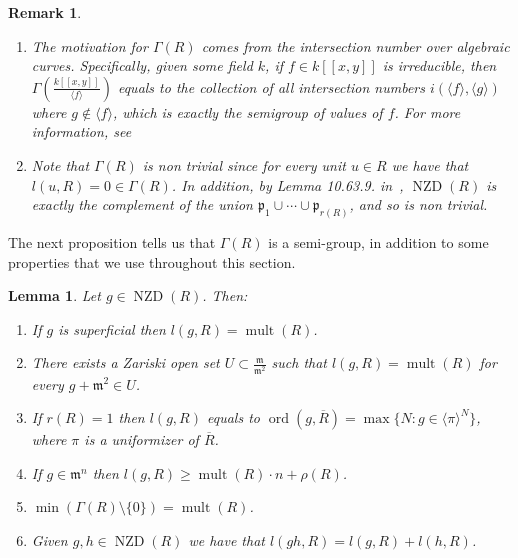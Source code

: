 \documentclass{article}
\newtheorem{lemma}[theorem]{Lemma}
\newtheorem{remark}[theorem]{Remark}
\DeclareMathOperator{\ord}{ord}
\DeclareMathOperator{\NZD}{NZD}
\DeclareMathOperator{\mult}{mult}
\numberwithin{theorem}{section}
\begin{document}
\begin{remark}\label{rem:intersection}
\begin{enumerate}
    \item \textup{The motivation for $\Gamma(R)$ comes from the intersection number over algebraic curves. Specifically, given some field $k$, if $f \in k[[x,y]]$ is irreducible, then $\Gamma\left(\frac{k[[x,y]]}{\langle f\rangle}\right)$ equals to the collection of all intersection numbers $i(\langle f\rangle, \langle g\rangle)$ where $g \notin \langle f \rangle$, which is exactly the semigroup of values of $f$. For more information, see~\cite{barroso2012approach,hefez2003irreducible,castellanos2005semigroup} }
    \item \textup{Note that $\Gamma(R)$ is non trivial since for every unit $u \in R$ we have that $l(u,R)=0 \in \Gamma(R)$. In addition, by Lemma 10.63.9. in~\cite{stacks-project},  $\NZD(R)$ is exactly the complement of the union $\mathfrak{p}_1 \cup \cdots \cup \mathfrak{p}_{r(R)}$, and so is non trivial. }
\end{enumerate}
\end{remark}

The next proposition tells us that $\Gamma(R)$ is a semi-group, in addition to some properties that we use throughout this section.  

\begin{lemma}\label{lem:semigroup}
Let $g \in \NZD(R)$. Then: 
    \begin{enumerate}
        \item If $g$ is superficial then $l(g,R)=\mult(R)$. 
        \item There exists a Zariski open set $U \subset \frac{\mathfrak{m}}{\mathfrak{m}^2}$ such that $l(g,R)=\mult(R)$ for every $g+\mathfrak{m}^2 \in U$. 
        \item If  $r(R)=1$ then $l(g,R)$ equals to $\ord(g, \overline{R})= \max\{N \colon g \in \langle \pi \rangle^N\}$, where $\pi$ is a uniformizer of $\overline{R}$.
        \item If $g \in \mathfrak{m}^n$ then $l(g,R) \geq \mult(R) \cdot n + \rho(R)$.
        \item $\min(\Gamma(R)\setminus \{0\})=\mult(R)$.
        \item Given $g, h \in \NZD(R)$ we have that $l(gh, R)=l(g, R)+l(h,R)$.  
    \end{enumerate}
\end{lemma}
\end{document}
